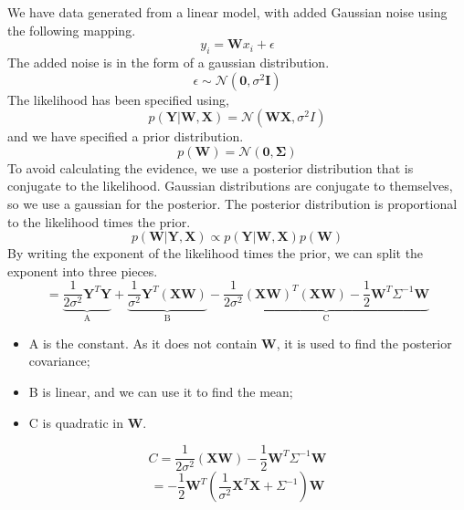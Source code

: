 \documentclass[10pt, a4paper, twocolumn]{article} %
\begin{document}
We have data generated from a linear model, with added Gaussian noise using the following mapping. 
\begin{equation*}
y_i = \mathbf{W}x_i + \epsilon
\end{equation*}
The added noise is in the form of a gaussian distribution.\\
\begin{equation*}
\epsilon \sim \mathcal{N}(\mathbf{0}, \sigma^2 \mathbf{I})
\end{equation*}
The likelihood has been specified using,
\begin{equation*}
p(\mathbf{Y}|\mathbf{W},\mathbf{X}) = \mathcal{N}(\mathbf{W} \mathbf{X}, \sigma^2I)
\end{equation*}
and we have specified a prior distribution. 
\begin{equation*}
p(\mathbf{W}) = \mathcal{N}(\mathbf{0}, \mathbf{\Sigma})
\end{equation*}
To avoid calculating the evidence, we use a posterior distribution that is conjugate to the likelihood. Gaussian distributions are conjugate to themselves, so we use a gaussian for the posterior. The posterior distribution is proportional to the likelihood times the prior. 
\begin{equation*}
p(\mathbf{W}|\mathbf{Y},\mathbf{X}) \propto p(\mathbf{Y}|\mathbf{W},\mathbf{X})p(\mathbf{W})
\end{equation*}
By writing the exponent of the likelihood times the prior, we can split the exponent into three pieces. 
\begin{equation}
= \underbrace{\frac{1}{2\sigma^2}\mathbf{Y}^{T}\mathbf{Y}}_\text{A} + \underbrace{\frac{1}{\sigma^{2}}\mathbf{Y}^{T}(\mathbf{XW})}_\text{B}-\underbrace{\frac{1}{2\sigma^2}(\mathbf{XW})^T(\mathbf{XW})-\frac{1}{2}\mathbf{W}^{T}\Sigma^{-1}\mathbf{W}}_\text{C}
\end{equation}
\begin{itemize}
\item A is the constant. As it does not contain $\mathbf{W}$, it is used to find the posterior covariance;
\item B is linear, and we can use it to find the mean;
\item C is quadratic in $\mathbf{W}$.
\end{itemize}
\begin{equation*}
C=\frac{1}{2\sigma^{2}}(\mathbf{XW})-\frac{1}{2}\mathbf{W}^{T}\Sigma^{-1}\mathbf{W}
\end{equation*}
\begin{equation*}
= -\frac{1}{2}\mathbf{W}^{T}(\frac{1}{\sigma^{2}}\mathbf{X}^{T}\mathbf{X} + \Sigma^{-1})\mathbf{W}
\end{equation*}
\end{document}
